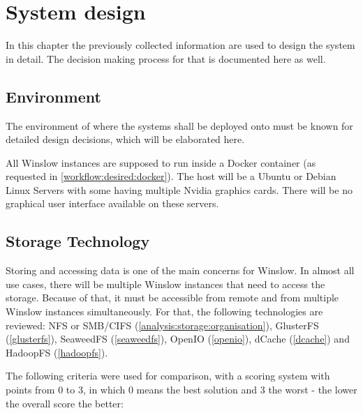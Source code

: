 \chapter{System design}

In this chapter the previously collected information are used to design the system in detail.
The decision making process for that is documented here as well.

\section{Environment}

The environment of where the systems shall be deployed onto must be known for detailed design decisions, which will be elaborated here.

All Winslow instances are supposed to run inside a Docker container (as requested in \autoref{workflow:desired:docker}).
The host will be a Ubuntu or Debian Linux Servers with some having multiple Nvidia graphics cards.
There will be no graphical user interface available on these servers.


\section{Storage Technology}

Storing and accessing data is one of the main concerns for Winslow.
In almost all use cases, there will be multiple Winslow instances that need to access the storage.
Because of that, it must be accessible from remote and from multiple Winslow instances simultaneously.
For that, the following technologies are reviewed: NFS or SMB/CIFS (\autoref{analysis:storage:organisation}),  GlusterFS (\autoref{glusterfs}), SeaweedFS (\autoref{seaweedfs}), OpenIO (\autoref{openio}), dCache (\autoref{dcache}) and HadoopFS (\autoref{hadoopfs}).

The following criteria were used for comparison, with a scoring system with points from 0 to 3, in which 0 means the best solution and 3 the worst - the lower the overall score the better:

